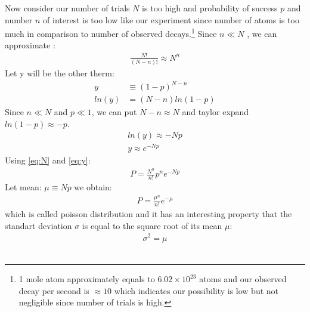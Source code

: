 \documentclass[reprint,amsmath,aps,nofootinbib,english]{revtex4-2}
\begin{document}
Now consider our number of trials $N$ is too high and probability of success $p$ and number $n$ of interest is too low like our experiment since number of atoms is too much in comparison to number of observed decays.\footnote{1 mole atom approximately equals to $6.02\times 10^{23}$ atoms and our observed decay per second is $\approx 10$ which indicates our possibility is low but not negligible since number of trials is high.} Since $n \ll N$ , we can approximate \cite{berk}:
\begin{align}
        \frac{N!}{(N-n)!} \approx N^n \label{eq:N}
\end{align}
Let y will be the other therm:
\begin{align}
        y &\equiv (1-p)^{N-n} \\
        ln(y) &= (N-n) ln(1-p)
\end{align}
Since $n \ll N$ and $p \ll 1$, we can put $N-n \approx N$ and taylor expand $ln(1-p) \approx -p$.
\begin{align}
        ln(y) \approx -Np \\
        y \approx e^{-Np} \label{eq:y}
\end{align}
Using \eqref{eq:N} and \eqref{eq:y}:
\begin{align}
        P = \frac{N^n}{n!}p^n e^{-Np}
\end{align}
Let mean: $\mu \equiv Np$ we obtain:
\begin{align}
        P = \frac{\mu ^n}{n!} e^{-\mu} \label{eq:poiss}
\end{align}
which is called poisson distribution and it has an interesting property that the standart deviation $\sigma$ is equal to the square root of its mean $\mu$:
\begin{align}
        \sigma^2 = \mu
\end{align}
\\
\end{document}
